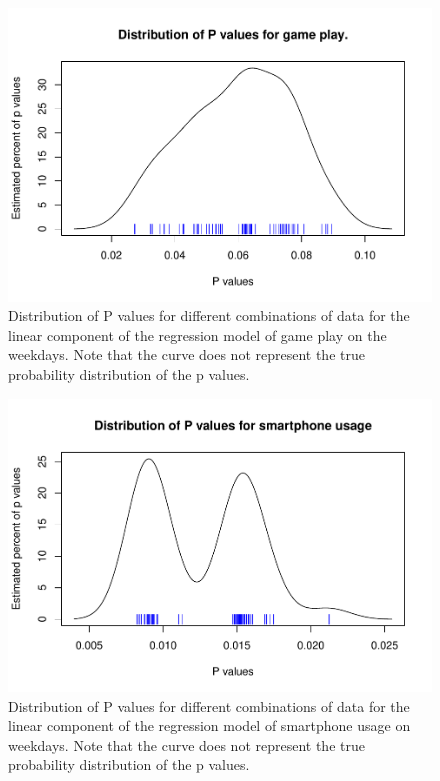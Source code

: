 \documentclass[man]{apa6}
\theoremstyle{definition}
\theoremstyle{definition}
\theoremstyle{definition}
\theoremstyle{remark}
\begin{document}
\begin{figure}

\includegraphics{stats_6_final_files/figure-latex/plotpfirst-1} \hfill{}

\caption{Distribution of P values for different combinations of data for the linear component of the regression model of game play on the weekdays. Note that the curve does not represent the true probability distribution of the p values.}\label{fig:plotpfirst}
\end{figure}
\begin{figure}

\includegraphics{stats_6_final_files/figure-latex/plotpsecond-1} \hfill{}

\caption{Distribution of P values for different combinations of data for the linear component of the regression model of smartphone usage on weekdays. Note that the curve does not represent the true probability distribution of the p values.}\label{fig:plotpsecond}
\end{figure}
\end{document}
